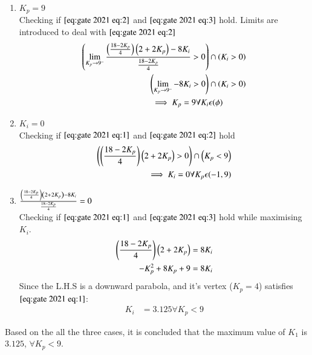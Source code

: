 \documentclass[journal,12pt,onecolumn]{IEEEtran}
\theoremstyle{remark}
\begin{document}
    \begin{enumerate}
        \item $K_p=9$\\
Checking if $\eqref{eq:gate 2021 eq:2}$ and $\eqref{eq:gate 2021 eq:3}$ hold. Limits are introduced to deal with $\eqref{eq:gate 2021 eq:2}$
         \begin{align}
       \left(\lim_{K_p\to9^-} \frac{\left(\frac{18-2K_p}{4}\right)\left(2 + 2K_p\right)-8K_i}{\frac{18-2K_p}{4}} > 0\right) &\cap \left(K_i > 0\right)\\
       \left(\lim_{K_p\to9^-} -8K_i > 0\right) &\cap \left({K_i > 0}\right)\\
  \implies K_p=9 \forall K_i &\epsilon (\phi)
    \end{align}
    \item  $K_i=0$\\
    Checking if $\eqref{eq:gate 2021 eq:1}$ and $\eqref{eq:gate 2021 eq:2}$ hold
    \begin{align}
        \left(\left(\frac{18-2K_p}{4}\right)\left(2 + 2K_p\right) > 0\right)  \cap \left(K_p < 9\right)\\
        \implies K_i=0 \forall K_p \epsilon (-1 , 9)
    \end{align}
    \item $\frac{\left(\frac{18-2K_p}{4}\right)\left(2 + 2K_p\right)-8K_i}{\frac{18-2K_p}{4}} = 0$\\
        Checking if $\eqref{eq:gate 2021 eq:1}$ and $\eqref{eq:gate 2021 eq:3}$ hold while maximising $K_i$.
        \begin{align}
            \left(\frac{18-2K_p}{4}\right)\left(2 + 2K_p\right) = 8K_i\\
             -K_p^2 +8K_p + 9 = 8K_i
        \end{align}
        Since the L.H.S is a downward parabola, and it's vertex ($K_p=4$) satisfies $\eqref{eq:gate 2021 eq:1}$:
        \begin{align}
            K_i &= 3.125 \forall K_p < 9
        \end{align}
    \end{enumerate}
    Based on the all the three cases, it is concluded that the maximum value of $K_1$ is $3.125$, $\forall K_p < 9$.
   
    
\end{document}

